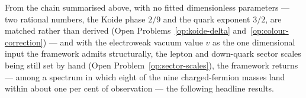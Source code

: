 
From the chain summarised above, with no fitted dimensionless parameters --- two rational
numbers, the Koide phase $2/9$ and the quark exponent $3/2$, are matched rather than derived
(Open Problems~\ref{op:koide-delta} and~\ref{op:colour-correction}) --- and with the electroweak
vacuum value $v$ as the one dimensional input the framework admits structurally, the lepton and
down-quark sector scales being still set by hand (Open Problem~\ref{op:sector-scales}), the
framework returns --- among a spectrum in which eight of the nine charged-fermion masses land
within about one per cent of observation --- the following headline results.

